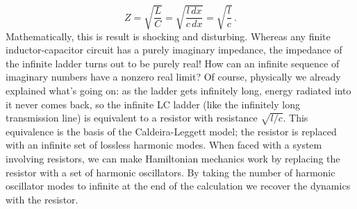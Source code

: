 \begin{equation}
  Z = \sqrt{\frac{L}{C}} = \sqrt{ \frac{\mathit{l} \, dx}{\mathit{c} \, dx}} = \sqrt{\frac{\mathit{l}}{\mathit{c}}} \, .
\end{equation}
Mathematically, this is result is shocking and disturbing.
Whereas any finite inductor-capacitor circuit has a purely imaginary impedance, the impedance of the infinite ladder turns out to be purely real!
How can an infinite sequence of imaginary numbers have a nonzero real limit?
Of course, physically we already explained what's going on: as the ladder gets infinitely long, energy radiated into it never comes back, so the infinite LC ladder (like the infinitely long transmission line) is equivalent to a resistor with resistance $\sqrt{\mathit{l}/\mathit{c}}$.
This equivalence is the basis of the Caldeira-Leggett model; the resistor is replaced with an infinite set of lossless harmonic modes.
When faced with a system involving resistors, we can make Hamiltonian mechanics work by replacing the resistor with a set of harmonic oscillators.
By taking the number of harmonic oscillator modes to infinite at the end of the calculation we recover the dynamics with the resistor.

